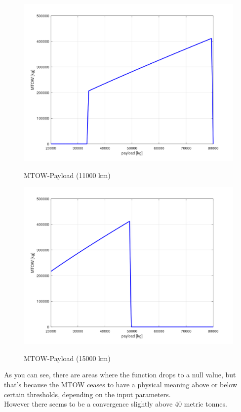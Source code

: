 \documentclass{article}
\begin{document}
\begin{figure}[h!]
    \centering
    \includegraphics[width=\textwidth]{Sources/Plots_and_Pictures/MTOW_payload.png}
    \label{MTOW_Payload_11}
    \caption{MTOW-Payload (11000 km)}
\end{figure}
\clearpage
\begin{figure}[h!]
    \centering
    \includegraphics[width=\textwidth]{Sources/Plots_and_Pictures/MTOW_payload_2.png}
    \label{MTOW_Payload_15}
    \caption{MTOW-Payload (15000 km)}
\end{figure}
As you can see, there are areas where the function drops to a null value,
but that's because the MTOW ceases to have a physical meaning above or below certain
thresholds, depending on the input parameters. \\ 
However there seems to be a convergence slightly above 40 metric tonnes.
\clearpage
\end{document}
